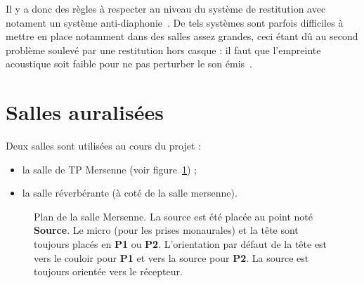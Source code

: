 Il y a donc des règles à respecter au niveau du système de restitution avec notament un système
anti-diaphonie~\cite{Kle93}. De tels systèmes sont parfois difficiles à mettre en place notamment dans des salles assez
grandes, ceci étant dû au second problème soulevé par une restitution hors casque : il faut que l'empreinte acoustique
soit faible pour ne pas perturber le son émis~\cite{Bru10}.

\section{Salles auralisées} %

Deux salles sont utilisées au cours du projet :

\begin{itemize}
    \item la salle de TP Mersenne (voir figure~\ref{plan_mersenne}) ;
    \item la salle réverbérante (à coté de la salle mersenne).
\end{itemize}

\begin{figure}[h!]
    \caption{\label{plan_mersenne}Plan de la salle Mersenne. La source est été placée au point noté
    \textbf{Source}. Le micro (pour les prises monaurales) et la tête sont toujours placés en \textbf{P1} ou
    \textbf{P2}. L'orientation par défaut de la tête est vers le couloir pour \textbf{P1} et vers la source pour
    \textbf{P2}. La source est toujours orientée vers le récepteur.}
\end{figure}
